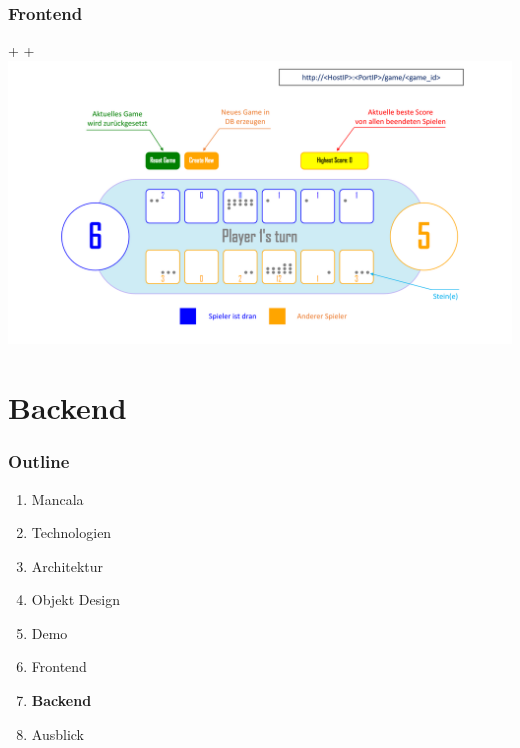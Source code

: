 \documentclass[
	10pt,
	t		%
]{beamer}
\begin{document}
\begin{frame}
\frametitle{Frontend}
+\hspace*{-0.8cm}
+\includegraphics[scale=0.36]{./pictures/GUI_Explanation.pdf}
\end{frame}

\section{Backend}
\begin{frame}
\frametitle{Outline}
\begin{enumerate}
\item Mancala
\item Technologien
\item Architektur
\item Objekt Design
\item Demo
\item Frontend
\item \textbf{Backend}
\item Ausblick
\end{enumerate}
\end{frame}
\end{document}
